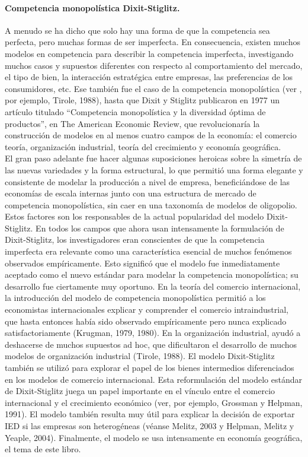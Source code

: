 \paragraph{Competencia monopolística Dixit-Stiglitz.}
A menudo se ha dicho que solo hay una forma de que la competencia sea perfecta, pero muchas formas de ser imperfecta. En consecuencia, existen muchos modelos en competencia para describir la competencia imperfecta, investigando muchos casos y supuestos diferentes con respecto al comportamiento del mercado, el tipo de bien, la interacción estratégica entre empresas, las preferencias de los consumidores, etc. Ese también fue el caso de la competencia monopolística (ver , por ejemplo, Tirole, 1988), hasta que Dixit y Stiglitz publicaron en 1977 un artículo titulado “Competencia monopolística y la diversidad óptima de productos”, en The American Economic Review, que revolucionaría la construcción de modelos en al menos cuatro campos de la economía: el comercio teoría, organización industrial, teoría del crecimiento y economía geográfica.\\
El gran paso adelante fue hacer algunas suposiciones heroicas sobre la simetría de las nuevas variedades y la forma estructural, lo que permitió una forma elegante y consistente de modelar la producción a nivel de empresa, beneficiándose de las economías de escala internas junto con una estructura de mercado de competencia monopolística, sin caer en una taxonomía de modelos de oligopolio. Estos factores son los responsables de la actual popularidad del modelo Dixit-Stiglitz. En todos los campos que ahora usan intensamente la formulación de Dixit-Stiglitz, los investigadores eran conscientes de que la competencia imperfecta era relevante como una característica esencial de muchos fenómenos observados empíricamente. Esto significó que el modelo fue inmediatamente aceptado como el nuevo estándar para modelar la competencia monopolística; su desarrollo fue ciertamente muy oportuno. En la teoría del comercio internacional, la introducción del modelo de competencia monopolística permitió a los economistas internacionales explicar y comprender el comercio intraindustrial, que hasta entonces había sido observado empíricamente pero nunca explicado satisfactoriamente (Krugman, 1979, 1980). En la organización industrial, ayudó a deshacerse de muchos supuestos ad hoc, que dificultaron el desarrollo de muchos modelos de organización industrial (Tirole, 1988). El modelo Dixit-Stiglitz también se utilizó para explorar el papel de los bienes intermedios diferenciados en los modelos de comercio internacional. Esta reformulación del modelo estándar de Dixit-Stiglitz juega un papel importante en el vínculo entre el comercio internacional y el crecimiento económico (ver, por ejemplo, Grossman y Helpman, 1991). El modelo también resulta muy útil para explicar la decisión de exportar IED si las empresas son heterogéneas (véanse Melitz, 2003 y Helpman, Melitz y Yeaple, 2004). Finalmente, el modelo se usa intensamente en economía geográfica, el tema de este libro.


